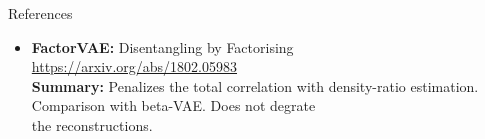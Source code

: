 \documentclass{beamer}
\begin{document}
\begin{frame}{References}
{\begin{itemize}
    \item \textbf{FactorVAE:} Disentangling by Factorising \\
    \href{https://arxiv.org/abs/1802.05983}{https://arxiv.org/abs/1802.05983} \\
    \textbf{Summary:} Penalizes the total correlation with density-ratio estimation. Comparison with beta-VAE. Does not degrate \\ the reconstructions.
\end{itemize}
}
\end{frame}
\end{document}
